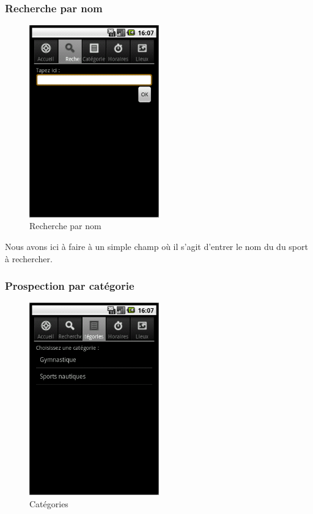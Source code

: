 \documentclass{article}
\begin{document}
		\subsubsection{Recherche par nom}

		\begin{figure}[ht]
			\centering
			\includegraphics[width=0.5\textwidth]{recherche.png}
			\caption{Recherche par nom}
			\label{fig:recherche}
		\end{figure}

		Nous avons ici à faire à un simple champ où il s'agit d'entrer le nom du
		du sport à rechercher.

		\subsubsection{Prospection par catégorie}

		\begin{figure}[ht]
			\centering
			\includegraphics[width=0.5\textwidth]{categories.png}
			\caption{Catégories}
			\label{fig:categories}
		\end{figure}
\end{document}
